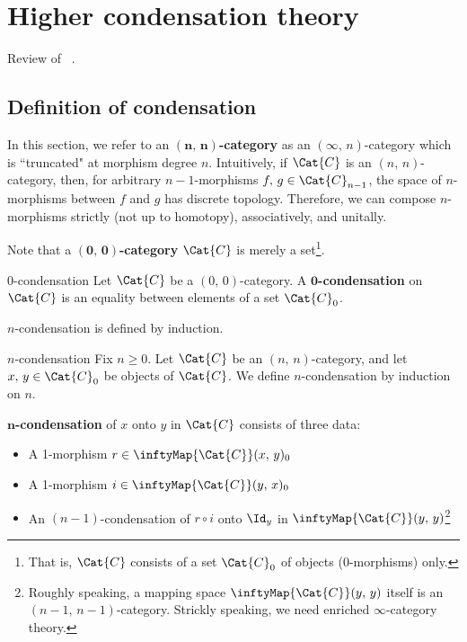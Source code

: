 \documentclass[TQFT_main]{subfiles}
\begin{document}
\setcounter{chapter}{4}

\chapter{Higher condensation theory}

Review of ~\cite{gaiotto2025condensationshighercategories}.

\section{Definition of condensation}

In this section, we refer to an $\bm{(n,\, n)}$\textbf{-category} as an $(\infty,\, n)$-category which is ``truncated" at morphism degree $n$.
Intuitively, if $\Cat{C}$ is an $(n,\, n)$-category, then, for arbitrary $n-1$-morphisms $f,\, g \in \Cat{C}_{n-1}$, the space of $n$-morphisms between $f$ and $g$ has discrete topology. 
Therefore, we can compose $n$-morphisms strictly (not up to homotopy), associatively, and unitally.

Note that a $\bm{(0,\, 0)}$\textbf{-category} $\Cat{C}$ is merely a set\footnote{That is, $\Cat{C}$ consists of a set $\Cat{C}_0$ of objects (0-morphisms) only.}.

\begin{mydef}[label=def:0-cond]{0-condensation}
    Let $\Cat{C}$ be a $(0,\, 0)$-category.
    A $\bm{0}$\textbf{-condensation} on $\Cat{C}$ is an equality between elements of a set $\Cat{C}_0$.
\end{mydef}

$n$-condensation is defined by induction.

\begin{mydef}[label=def:n-cond]{{$n$}-condensation}
    Fix $n \ge 0$.
    Let $\Cat{C}$ be an $(n,\, n)$-category, and let $x,\, y \in \Cat{C}_0$ be objects of $\Cat{C}$.
    We define $n$-condensation by induction on $n$.

    $\bm{n}$\textbf{-condensation} of $x$ onto $y$ in $\Cat{C}$ consists of three data:
    \begin{itemize}
        \item A 1-morphism $r \in \inftyMap{\Cat{C}} (x,\, y)_0$
        \item A 1-morphism $i \in \inftyMap{\Cat{C}} (y,\, x)_0$
        \item An $(n-1)$-condensation of $r \circ i$ onto $\Id_y$ in $\inftyMap{\Cat{C}} (y,\, y)$\footnote{Roughly speaking, a mapping space $\inftyMap{\Cat{C}} (y,\, y)$ itself is an $(n-1,\, n-1)$-category. Strickly speaking, we need enriched $\infty$-category theory.} 
    \end{itemize}
\end{mydef}
\end{document}
